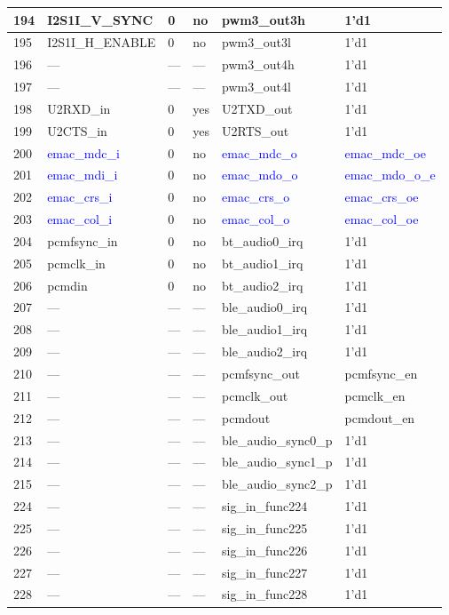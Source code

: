 \begin{longtable}[c]{|p{1cm}|p{3.8cm}|p{2.0cm}|p{2.9cm}|p{4.8cm}|p{3.0cm}| }
    194 & I2S1I\_V\_SYNC & 0 & no & pwm3\_out3h & 1'd1 \\ \hline
    195 & I2S1I\_H\_ENABLE & 0 & no & pwm3\_out3l & 1'd1 \\ \hline
    196 & --- & --- & --- & pwm3\_out4h & 1'd1 \\ \hline
    197 & --- & --- & --- & pwm3\_out4l & 1'd1 \\ \hline
    198 & U2RXD\_in & 0 & yes & U2TXD\_out & 1'd1 \\ \hline
    199 & U2CTS\_in & 0 & yes & U2RTS\_out & 1'd1 \\ \hline
    200 &  \textcolor{blue}{ emac\_mdc\_i} & 0 & no & \textcolor{blue}{emac\_mdc\_o} &  \textcolor{blue}{emac\_mdc\_oe} \\ \hline
    201 &  \textcolor{blue}{emac\_mdi\_i} & 0 & no &  \textcolor{blue}{emac\_mdo\_o} &  \textcolor{blue}{emac\_mdo\_o\_e} \\ \hline
    202 &  \textcolor{blue}{emac\_crs\_i} & 0 & no &  \textcolor{blue}{emac\_crs\_o} &  \textcolor{blue}{emac\_crs\_oe} \\ \hline
    203 &  \textcolor{blue}{emac\_col\_i} & 0 & no &  \textcolor{blue}{emac\_col\_o} &  \textcolor{blue}{emac\_col\_oe} \\ \hline
    204 & pcmfsync\_in & 0 & no & bt\_audio0\_irq & 1'd1 \\ \hline
    205 & pcmclk\_in & 0 & no & bt\_audio1\_irq & 1'd1 \\ \hline
    206 & pcmdin & 0 & no & bt\_audio2\_irq & 1'd1 \\ \hline
    207 & --- & --- & --- & ble\_audio0\_irq & 1'd1 \\ \hline
    208 & --- & --- & --- & ble\_audio1\_irq & 1'd1 \\ \hline
    209 & --- & --- & --- & ble\_audio2\_irq & 1'd1 \\ \hline
    210 & --- & --- & --- & pcmfsync\_out & pcmfsync\_en \\ \hline
    211 & --- & --- & --- & pcmclk\_out & pcmclk\_en \\ \hline
    212 & --- & --- & --- & pcmdout & pcmdout\_en \\ \hline
    213 & --- & --- & --- & ble\_audio\_sync0\_p & 1'd1 \\ \hline
    214 & --- & --- & --- & ble\_audio\_sync1\_p & 1'd1 \\ \hline
    215 & --- & --- & --- & ble\_audio\_sync2\_p & 1'd1 \\ \hline
    224 & --- & --- & --- & sig\_in\_func224 & 1'd1 \\ \hline
    225 & --- & --- & --- & sig\_in\_func225 & 1'd1 \\ \hline
    226 & --- & --- & --- & sig\_in\_func226 & 1'd1 \\ \hline
    227 & --- & --- & --- & sig\_in\_func227 & 1'd1 \\ \hline
    228 & --- & --- & --- & sig\_in\_func228 & 1'd1 \\ \hline
    
    \end{longtable}
